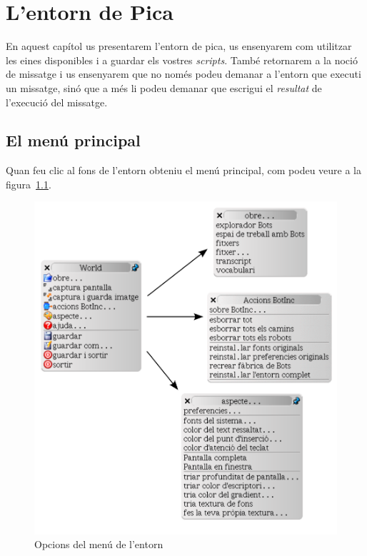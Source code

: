 \chapter{L'entorn de Pica}
\label{cap5}

En aquest capítol us presentarem l'entorn de pica, us ensenyarem com utilitzar les eines disponibles i a guardar els vostres \emph{scripts}. També retornarem a la noció de missatge i us ensenyarem que no només podeu demanar a l'entorn que executi un missatge, sinó que a més li podeu demanar que escrigui el \emph{resultat} de l'execució del missatge.

\section{El menú principal}
Quan feu clic al fons de l'entorn obteniu el menú principal, com podeu veure a la figura~\ref{fig0501}.

\begin{figure}[h]
\begin{center}
\includegraphics[scale=0.5]{Imatges/figura5-1}
\end{center}
\caption{Opcions del menú de l'entorn}
\label{fig0501}
\end{figure}

